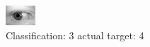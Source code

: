 \begin{figure}[h!]
\begin{center}
\includegraphics[width=0.60\columnwidth]{figures/ID705_class_3_target_4.png}
\end{center}
\caption{ Classification: 3 actual target: 4}
\label{fig:ID705_class_3_target_4}
\end{figure}
